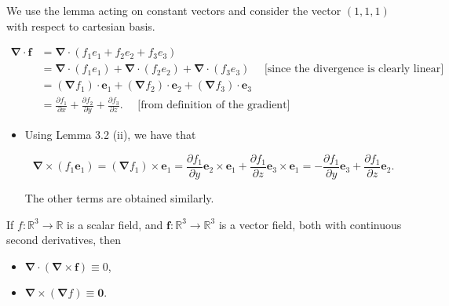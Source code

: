 \begin{proofidea}
  We use the lemma acting on constant vectors and consider the vector \((1,1,1)\) with respect to cartesian basis.
  
\end{proofidea}
  
\begin{formalproof}
  
\[
\begin{aligned}
\boldsymbol{\nabla} \cdot \boldsymbol{f} & =\boldsymbol{\nabla} \cdot\left(f_1 e_1+f_2 e_2+f_3 e_3\right) \\
& =\boldsymbol{\nabla} \cdot\left(f_1 e_1\right)+\boldsymbol{\nabla} \cdot\left(f_2 e_2\right)+\boldsymbol{\nabla} \cdot\left(f_3 e_3\right) \quad \text { [since the divergence is clearly linear] } \\
& =\left(\boldsymbol{\nabla} f_1\right) \cdot \boldsymbol{e}_1+\left(\boldsymbol{\nabla} f_2\right) \cdot \boldsymbol{e}_2+\left(\boldsymbol{\nabla} f_3\right) \cdot \boldsymbol{e}_3 \\
& =\frac{\partial f_1}{\partial x}+\frac{\partial f_2}{\partial y}+\frac{\partial f_3}{\partial z} . \quad \text { [from definition of the gradient] }
\end{aligned}
\]

\begin{itemize}
\item[(ii)] Using Lemma 3.2 (ii), we have that

\[
\boldsymbol{\nabla} \times\left(f_1 \boldsymbol{e}_1\right)=\left(\boldsymbol{\nabla} f_1\right) \times \boldsymbol{e}_1=\frac{\partial f_1}{\partial y} \boldsymbol{e}_2 \times \boldsymbol{e}_1+\frac{\partial f_1}{\partial z} \boldsymbol{e}_3 \times \boldsymbol{e}_1=-\frac{\partial f_1}{\partial y} \boldsymbol{e}_3+\frac{\partial f_1}{\partial z} \boldsymbol{e}_2 .
\]

The other terms are obtained similarly.
\end{itemize}

\end{formalproof}


\begin{corollary}
  If \(f: \mathbb{R}^3 \rightarrow \mathbb{R}\) is a scalar field, and \(\boldsymbol{f}: \mathbb{R}^3 \rightarrow \mathbb{R}^3\) is a vector field, both with continuous second derivatives, then
\begin{itemize}
\item[(i)] \(\boldsymbol{\nabla} \cdot(\boldsymbol{\nabla} \times \boldsymbol{f}) \equiv 0\),
\item[(ii)] \(\boldsymbol{\nabla} \times(\boldsymbol{\nabla} f) \equiv \mathbf{0}\).
\end{itemize}
\end{corollary}

